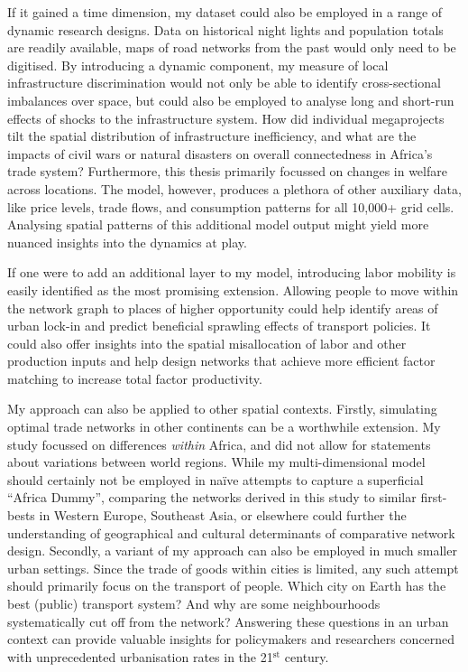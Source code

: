 \documentclass[11pt, oneside]{article}   	%
\begin{document}
If it gained a time dimension, my dataset could also be employed in a range of dynamic research designs. Data on historical night lights and population totals are readily available, maps of road networks from the past would only need to be digitised. By introducing a dynamic component, my measure of local infrastructure discrimination would not only be able to identify cross-sectional imbalances over space, but could also be employed to analyse long and short-run effects of shocks to the infrastructure system. How did individual megaprojects tilt the spatial distribution of infrastructure inefficiency, and what are the impacts of civil wars or natural disasters on overall connectedness in Africa's trade system? Furthermore, this thesis primarily focussed on changes in welfare across locations. The model, however, produces a plethora of other auxiliary data, like price levels, trade flows, and consumption patterns for all 10,000+ grid cells. Analysing spatial patterns of this additional model output might yield more nuanced insights into the dynamics at play.

If one were to add an additional layer to my model, introducing labor mobility is easily identified as the most promising extension. Allowing people to move within the network graph to places of higher opportunity could help identify areas of urban lock-in and predict beneficial sprawling effects of transport policies. It could also offer insights into the spatial misallocation of labor and other production inputs and help design networks that achieve more efficient factor matching to increase total factor productivity.

My approach can also be applied to other spatial contexts. Firstly, simulating optimal trade networks in other continents can be a worthwhile extension. My study focussed on differences \emph{within} Africa, and did not allow for statements about variations between world regions. While my multi-dimensional model should certainly not be employed in naïve attempts to capture a superficial ``Africa Dummy'', comparing the networks derived in this study to similar first-bests in Western Europe, Southeast Asia, or elsewhere could further the understanding of geographical and cultural determinants of comparative network design. Secondly, a variant of my approach can also be employed in much smaller urban settings. Since the trade of goods within cities is limited, any such attempt should primarily focus on the transport of people. Which city on Earth has the best (public) transport system? And why are some neighbourhoods systematically cut off from the network? Answering these questions in an urban context can provide valuable insights for policymakers and researchers concerned with unprecedented urbanisation rates in the 21$^{\textrm{st}}$ century.
\end{document}
